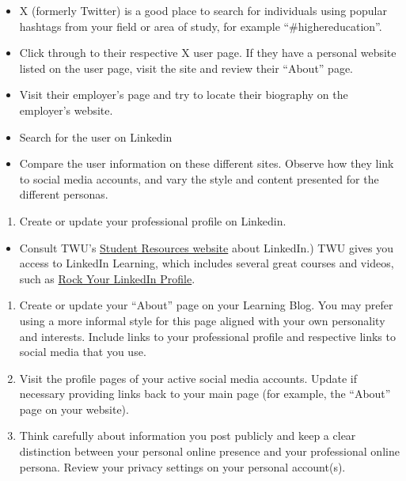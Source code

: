 \documentclass[
]{book}
\providecommand{\tightlist}{%
  \setlength{\itemsep}{0pt}\setlength{\parskip}{0pt}}
\theoremstyle{definition}
\theoremstyle{definition}
\theoremstyle{definition}
\theoremstyle{definition}
\theoremstyle{remark}
\begin{document}
\begin{reflect}
\begin{itemize}
\tightlist
\item
  X (formerly Twitter) is a good place to search for individuals using popular hashtags from your field or area of study, for example ``\#highereducation''.\\
\item
  Click through to their respective X user page. If they have a personal website listed on the user page, visit the site and review their ``About'' page.\\
\item
  Visit their employer's page and try to locate their biography on the employer's website.\\
\item
  Search for the user on Linkedin\\
\item
  Compare the user information on these different sites. Observe how they link to social media accounts, and vary the style and content presented for the different personas.
\end{itemize}

\begin{enumerate}
\def\labelenumi{\arabic{enumi}.}
\setcounter{enumi}{3}
\tightlist
\item
  Create or update your professional profile on Linkedin.
\end{enumerate}

\begin{itemize}
\tightlist
\item
  Consult TWU's \href{Student\%20Resources}{Student Resources website} about LinkedIn.) TWU gives you access to LinkedIn Learning, which includes several great courses and videos, such as \href{https://www.linkedin.com/learning/rock-your-linkedin-profile/connect-to-opportunity-with-linkedin?u=124451074}{Rock Your LinkedIn Profile}.
\end{itemize}

\begin{enumerate}
\def\labelenumi{\arabic{enumi}.}
\setcounter{enumi}{4}
\item
  Create or update your ``About'' page on your Learning Blog. You may prefer using a more informal style for this page aligned with your own personality and interests. Include links to your professional profile and respective links to social media that you use.
\item
  Visit the profile pages of your active social media accounts. Update if necessary providing links back to your main page (for example, the ``About'' page on your website).
\item
  Think carefully about information you post publicly and keep a clear distinction between your personal online presence and your professional online persona. Review your privacy settings on your personal account(s).
\end{enumerate}
\end{reflect}
\end{document}
